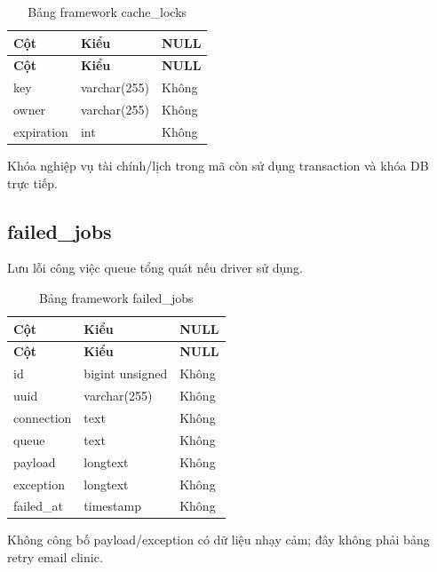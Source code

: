 {\fontsize{10}{12}\selectfont\setlength{\tabcolsep}{3pt}\renewcommand{\arraystretch}{1.12}
\begin{longtable}{@{}L{\textwidth-5.28pt\relax} L{\textwidth-4.8pt\relax} L{\textwidth-1.92pt\relax}@{}}
\caption{Bảng framework cache\_\allowbreak{}locks}\\
\toprule
\textbf{Cột} & \textbf{Kiểu} & \textbf{NULL}\\\midrule
\endfirsthead
\toprule
\textbf{Cột} & \textbf{Kiểu} & \textbf{NULL}\\\midrule
\endhead
\bottomrule\endlastfoot
key & varchar(255) & Không\\[1pt]
owner & varchar(255) & Không\\[1pt]
expiration & int & Không\\[1pt]
\end{longtable}}
{\small Khóa nghiệp vụ tài chính/\allowbreak{}lịch trong mã còn sử dụng transaction và khóa DB trực tiếp.\allowbreak{}

}

\subsection{failed\_\allowbreak{}jobs}
Lưu lỗi công việc queue tổng quát nếu driver sử dụng.\allowbreak{}


{\fontsize{10}{12}\selectfont\setlength{\tabcolsep}{3pt}\renewcommand{\arraystretch}{1.12}
\begin{longtable}{@{}L{\textwidth-5.28pt\relax} L{\textwidth-4.8pt\relax} L{\textwidth-1.92pt\relax}@{}}
\caption{Bảng framework failed\_\allowbreak{}jobs}\\
\toprule
\textbf{Cột} & \textbf{Kiểu} & \textbf{NULL}\\\midrule
\endfirsthead
\toprule
\textbf{Cột} & \textbf{Kiểu} & \textbf{NULL}\\\midrule
\endhead
\bottomrule\endlastfoot
id & bigint unsigned & Không\\[1pt]
uuid & varchar(255) & Không\\[1pt]
connection & text & Không\\[1pt]
queue & text & Không\\[1pt]
payload & longtext & Không\\[1pt]
exception & longtext & Không\\[1pt]
failed\_\allowbreak{}at & timestamp & Không\\[1pt]
\end{longtable}}
{\small Không công bố payload/\allowbreak{}exception có dữ liệu nhạy cảm; đây không phải bảng retry email clinic.\allowbreak{}

}
\clearpage

